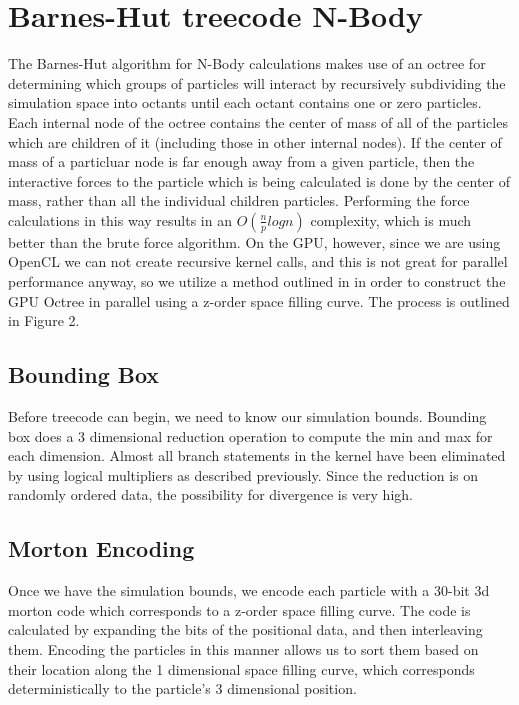 \documentclass[fleqn,10pt]{SelfArx} %
\begin{document}
\section{Barnes-Hut treecode N-Body}
The Barnes-Hut algorithm for N-Body calculations makes use of an octree for determining which groups of particles will interact by recursively subdividing the simulation space into octants until each octant contains one or zero particles. Each internal node of the octree contains the center of mass of all of the particles which are children of it (including those in other internal nodes). If the center of mass of a particluar node is far enough away from a given particle, then the interactive forces to the particle which is being calculated is done by the center of mass, rather than all the individual children particles. Performing the force calculations in this way results in an $O(\frac{n}{p} log n)$ complexity, which is much better than the brute force algorithm. On the GPU, however, since we are using OpenCL we can not create recursive kernel calls, and this is not great for parallel performance anyway, so we utilize a method outlined in \cite{Karras:2012} in order to construct the GPU Octree in parallel using a z-order space filling curve. The process is outlined in Figure 2.

\subsection{Bounding Box}
Before treecode can begin, we need to know our simulation bounds. Bounding box does a 3 dimensional reduction operation to compute the min and max for each dimension. Almost all branch statements in the kernel have been eliminated by using logical multipliers as described previously. Since the reduction is on randomly ordered data, the possibility for divergence is very high. 

\subsection{Morton Encoding}
Once we have the simulation bounds, we encode each particle with a 30-bit 3d morton code which corresponds to a z-order space filling curve. The code is calculated by expanding the bits of the positional data, and then interleaving them. Encoding the particles in this manner allows us to sort them based on their location along the 1 dimensional space filling curve, which corresponds deterministically to the particle’s 3 dimensional position.
\end{document}
